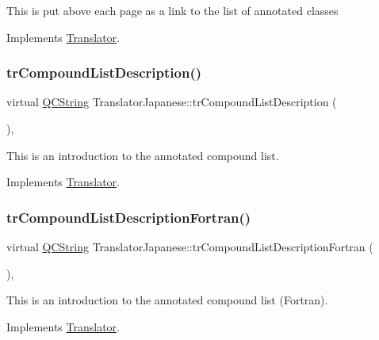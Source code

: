 This is put above each page as a link to the list of annotated classes 

Implements \mbox{\hyperlink{class_translator}{Translator}}.

\mbox{\label{class_translator_japanese_a90bdebbd4af4fc90cc7d19188a785215}} 
\subsubsection{\texorpdfstring{trCompoundListDescription()}{trCompoundListDescription()}}
{\footnotesize\ttfamily virtual \mbox{\hyperlink{class_q_c_string}{Q\+C\+String}} Translator\+Japanese\+::tr\+Compound\+List\+Description (\begin{DoxyParamCaption}{ }\end{DoxyParamCaption})\hspace{0.3cm}{\ttfamily [inline]}, {\ttfamily [virtual]}}

This is an introduction to the annotated compound list. 

Implements \mbox{\hyperlink{class_translator}{Translator}}.

\mbox{\label{class_translator_japanese_ac53f12f510b4b1919134719b58ff5e30}} 
\subsubsection{\texorpdfstring{trCompoundListDescriptionFortran()}{trCompoundListDescriptionFortran()}}
{\footnotesize\ttfamily virtual \mbox{\hyperlink{class_q_c_string}{Q\+C\+String}} Translator\+Japanese\+::tr\+Compound\+List\+Description\+Fortran (\begin{DoxyParamCaption}{ }\end{DoxyParamCaption})\hspace{0.3cm}{\ttfamily [inline]}, {\ttfamily [virtual]}}

This is an introduction to the annotated compound list (Fortran). 

Implements \mbox{\hyperlink{class_translator}{Translator}}.

